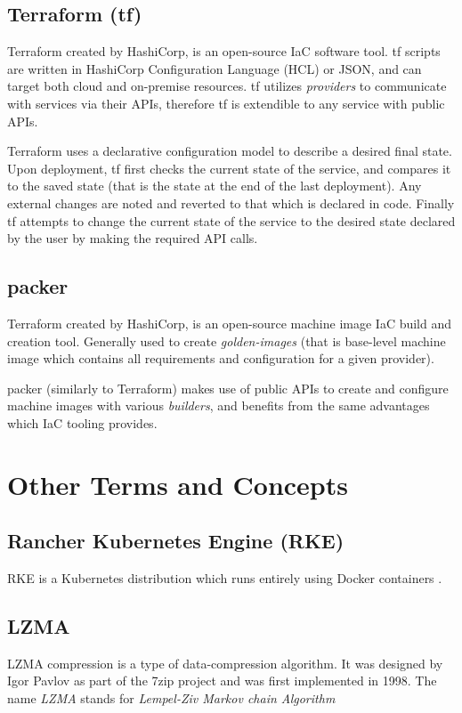 \section{Terraform (tf)}
Terraform created by HashiCorp\cite{hashicorp}, is an open-source IaC software tool. 
tf scripts are written in HashiCorp Configuration Language (HCL) or JSON, and can target both cloud and on-premise resources.
tf utilizes \textit{providers} to communicate with services via their APIs, therefore tf is extendible to any service with public APIs. 

Terraform uses a declarative configuration model to describe a desired final state. Upon deployment, tf first checks the current state of the service,
and compares it to the saved state (that is the state at the end of the last deployment). Any external changes are noted and reverted to that which is declared in code.
Finally tf attempts to change the current state of the service to the desired state declared by the user by making the required API calls.

\section{packer}
Terraform created by HashiCorp\cite{hashicorp}, is an open-source machine image IaC build and creation tool. 
Generally used to create \emph{golden-images} \cite{HashiCorp_packer_docs} (that is base-level machine image which contains all requirements and configuration for a given provider).

packer (similarly to Terraform) makes use of public APIs to create and configure machine images with various \textit{builders}, and benefits from the same advantages which IaC tooling provides.


\chapter{Other Terms and Concepts}
\section*{Rancher Kubernetes Engine (RKE)}
RKE is a Kubernetes distribution which runs entirely using Docker containers \cite{rke}. 

\section*{LZMA}
LZMA compression is a type of data-compression algorithm.
It was designed by Igor Pavlov as part of the 7zip \cite{pavlov_2022} project and was first implemented in 1998.
The name \textit{LZMA} stands for \textit{Lempel-Ziv Markov chain Algorithm}\cite{winzip_2021}

